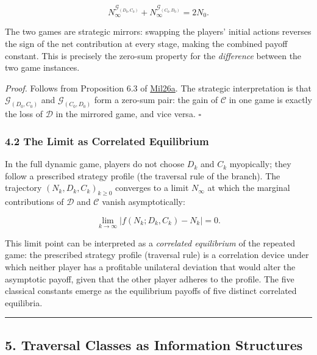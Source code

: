\documentclass[
  11pt,
  letterpaper,
]{article}
\begin{document}
\[N_\infty^{\mathcal{G}_{(D_0, C_0)}} + N_\infty^{\mathcal{G}_{(C_0, D_0)}} = 2 N_0.\]

The two games are strategic mirrors: swapping the players' initial
actions reverses the sign of the net contribution at every stage, making
the combined payoff constant. This is precisely the zero-sum property
for the \emph{difference} between the two game instances.

\emph{Proof.} Follows from Proposition 6.3 of
\href{https://github.com/baardev/truevalue/blob/main/docnav/Research/papers/1_recursive-tholonic-five-constants/1_recursive-tholonic-five-constants.pdf}{Mil26a}.
The strategic interpretation is that \(\mathcal{G}_{(D_0, C_0)}\) and
\(\mathcal{G}_{(C_0, D_0)}\) form a zero-sum pair: the gain of
\(\mathcal{C}\) in one game is exactly the loss of \(\mathcal{D}\) in
the mirrored game, and vice versa. \(\square\)

\subsubsection{4.2 The Limit as Correlated
Equilibrium}\label{the-limit-as-correlated-equilibrium}

In the full dynamic game, players do not choose \(D_k\) and \(C_k\)
myopically; they follow a prescribed strategy profile (the traversal
rule of the branch). The trajectory \((N_k, D_k, C_k)_{k \geq 0}\)
converges to a limit \(N_\infty\) at which the marginal contributions of
\(\mathcal{D}\) and \(\mathcal{C}\) vanish asymptotically:

\[\lim_{k \to \infty} \bigl| f(N_k; D_k, C_k) - N_k \bigr| = 0.\]

This limit point can be interpreted as a \emph{correlated equilibrium}
of the repeated game: the prescribed strategy profile (traversal rule)
is a correlation device under which neither player has a profitable
unilateral deviation that would alter the asymptotic payoff, given that
the other player adheres to the profile. The five classical constants
emerge as the equilibrium payoffs of five distinct correlated
equilibria.

\begin{center}\rule{0.5\linewidth}{0.5pt}\end{center}

\subsection{5. Traversal Classes as Information
Structures}\label{traversal-classes-as-information-structures}
\end{document}
